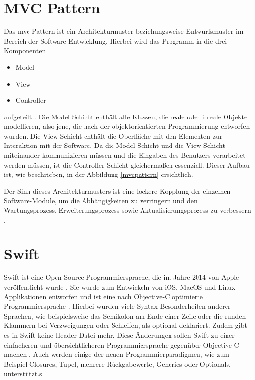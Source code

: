 \clearpage

\section{MVC Pattern}\label{mvc}
Das \gls{mvc} Pattern ist ein Architekturmuster beziehungsweise Entwurfsmuster im Bereich der Software-Entwicklung. 
Hierbei wird das Programm in die drei Komponenten
\begin{itemize}
	\item Model
	\item View
	\item Controller
\end{itemize}
aufgeteilt \cite[S.~18]{spring-book-3}. Die Model Schicht enthält alle Klassen, die reale oder irreale Objekte modellieren, also jene, die nach der objektorientierten Programmierung entworfen wurden. Die View Schicht enthält die Oberfläche mit den Elementen zur Interaktion mit der Software. Da die Model Schicht und die View Schicht miteinander kommunizieren müssen und die Eingaben des Benutzers verarbeitet werden müssen, ist die Controller Schicht gleichermaßen essenziell. Dieser Aufbau ist, wie beschrieben, in der Abbildung \ref{mvcpattern} ersichtlich.


Der Sinn dieses Architekturmusters ist eine lockere Kopplung der einzelnen Software-Module, um die Abhängigkeiten zu verringern und den Wartungsprozess, Erweiterungsprozess sowie Aktualisierungsprozess zu verbessern \cite[S.~18]{spring-book-3}.

\section{Swift}
Swift ist eine Open Source Programmiersprache, die im Jahre 2014 von Apple veröffentlicht wurde \cite{swift}. Sie wurde zum Entwickeln von iOS, MacOS und Linux Applikationen entworfen und ist eine nach Objective-C optimierte Programmiersprache \cite{swift}.
Hierbei wurden viele Syntax Besonderheiten anderer Sprachen, wie beispielsweise das Semikolon am Ende einer Zeile oder die runden Klammern bei Verzweigungen oder Schleifen, als optional deklariert. Zudem gibt es in Swift keine Header Datei mehr. Diese Änderungen sollen Swift zu einer einfacheren und übersichtlicheren Programmiersprache gegenüber Objective-C machen  \cite{swift}. Auch werden einige der neuen Programmierparadigmen, wie zum Beispiel Closures, Tupel, mehrere Rückgabewerte, Generics oder Optionals, unterstützt.s
